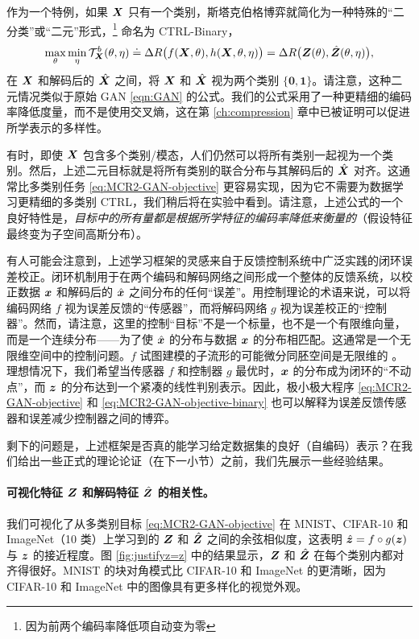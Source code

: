 \documentclass[../../book-main.tex]{subfiles}
\begin{document}
作为一个特例，如果 $\bm{X}$ 只有一个类别，斯塔克伯格博弈就简化为一种特殊的“二分类”或“二元”形式，\footnote{因为前两个编码率降低项自动变为零} 命名为 CTRL-Binary，
\begin{equation}
 \max_\theta \min_\eta \mathcal{T}^b_{\bm{X}}(\theta, \eta) \doteq \Delta R\big(f(\bm{X},\theta), h(\bm{X},\theta,\eta)\big) = \Delta R\big(\bm{Z}(\theta), \hat {\bm{Z}}(\theta, \eta)\big), 
    \label{eq:MCR2-GAN-objective-binary}
\end{equation}
在 $\bm{X}$ 和解码后的 $\hat{\bm{X}}$ 之间，将 $\bm{X}$ 和 $\hat {\bm{X}}$ 视为两个类别 $\{\bm 0, \bm 1\}$。请注意，这种二元情况类似于原始 GAN \eqref{eqn:GAN} 的公式。我们的公式采用了一种更精细的编码率降低度量，而不是使用交叉熵，这在第 \ref{ch:compression} 章中已被证明可以促进所学表示的多样性。

有时，即使 $\bm{X}$ 包含多个类别/模态，人们仍然可以将所有类别一起视为一个类别。然后，上述二元目标就是将所有类别的联合分布与其解码后的 $\hat {\bm{X}}$ 对齐。这通常比多类别任务 \eqref{eq:MCR2-GAN-objective} 更容易实现，因为它不需要为数据学习更精细的多类别 CTRL，我们稍后将在实验中看到。请注意，上述公式的一个良好特性是，{\em 目标中的所有量都是根据所学特征的编码率降低来衡量的}（假设特征最终变为子空间高斯分布）。

有人可能会注意到，上述学习框架的灵感来自于反馈控制系统中广泛实践的闭环误差校正。闭环机制用于在两个编码和解码网络之间形成一个整体的反馈系统，以校正数据 $\bm{x}$ 和解码后的 $\hat {\bm{x}}$ 之间分布的任何“误差”。用控制理论的术语来说，可以将编码网络 $f$ 视为误差反馈的“传感器”，而将解码网络 $g$ 视为误差校正的“控制器”。然而，请注意，这里的控制“目标”不是一个标量，也不是一个有限维向量，而是一个连续分布——为了使 $\hat {\bm{x}}$ 的分布与数据 $\bm{x}$ 的分布相匹配。这通常是一个无限维空间中的控制问题。$f$ 试图建模的子流形的可能微分同胚空间是无限维的 \cite{Lee2002IntroductionTS}。理想情况下，我们希望当传感器 $f$ 和控制器 $g$ 最优时，$\bm{x}$ 的分布成为闭环的“不动点”，而 $\bm{z}$ 的分布达到一个紧凑的线性判别表示。因此，极小极大程序 \eqref{eq:MCR2-GAN-objective} 和 \eqref{eq:MCR2-GAN-objective-binary} 也可以解释为误差反馈传感器和误差减少控制器之间的博弈。

剩下的问题是，上述框架是否真的能学习给定数据集的良好（自编码）表示？在我们给出一些正式的理论论证（在下一小节）之前，我们先展示一些经验结果。

\paragraph{可视化特征 $\bm{Z}$ 和解码特征 $\hat {\bm{Z}}$ 的相关性。} 我们可视化了从多类别目标 \eqref{eq:MCR2-GAN-objective} 在 MNIST、CIFAR-10 和 ImageNet（10 类）上学习到的 $\bm{Z}$ 和 $\hat{\bm{Z}}$ 之间的余弦相似度，这表明 $\hat{\bm{z}} = f\circ g(\bm{z})$ 与 $\bm{z}$ 的接近程度。图 \ref{fig:justifyz=z} 中的结果显示，$\bm{Z}$ 和 $\hat{\bm{Z}}$ 在每个类别内都对齐得很好。MNIST 的块对角模式比 CIFAR-10 和 ImageNet 的更清晰，因为 CIFAR-10 和 ImageNet 中的图像具有更多样化的视觉外观。
\end{document}
